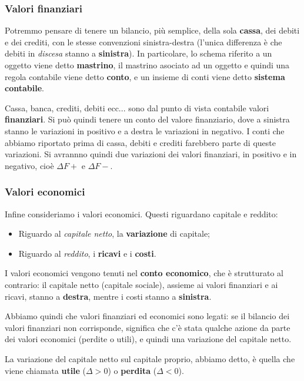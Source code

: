 \documentclass[a4paper,11pt]{article}
\begin{document}
\subsubsection{Valori finanziari}
Potremmo pensare di tenere un bilancio, più semplice, della sola \textbf{cassa}, dei debiti e dei crediti, con le stesse convenzioni sinistra-destra (l'unica differenza è che debiti in \textit{discesa} stanno a \textbf{sinistra}).
In particolare, lo schema riferito a un oggetto viene detto \textbf{mastrino}, il mastrino asociato ad un oggetto e quindi una regola contabile viene detto \textbf{conto}, e un insieme di conti viene detto \textbf{sistema contabile}.

Cassa, banca, crediti, debiti ecc... sono dal punto di vista contabile valori \textbf{finanziari}.
Si può quindi tenere un conto del valore finanziario, dove a sinistra stanno le variazioni in positivo e a destra le variazioni in negativo.
I conti che abbiamo riportato prima di cassa, debiti e crediti farebbero parte di queste variazioni.
Si avrannno quindi due variazioni dei valori finanziari, in positivo e in negativo, cioè $\Delta F+$ e $\Delta F-$.

\subsubsection{Valori economici}
Infine consideriamo i valori economici.
Questi riguardano capitale e reddito:
\begin{itemize}
	\item Riguardo al \textit{capitale netto}, la \textbf{variazione} di capitale;
	\item Riguardo al \textit{reddito}, i \textbf{ricavi} e i \textbf{costi}.
\end{itemize}

I valori economici vengono tenuti nel \textbf{conto economico}, che è strutturato al contrario: il capitale netto (capitale sociale), assieme ai valori finanziari e ai ricavi, stanno a \textbf{destra}, mentre i costi stanno a \textbf{sinistra}.

\par\medskip

Abbiamo quindi che valori finanziari ed economici sono legati: se il bilancio dei valori finanziari non corrisponde, significa che c'è stata qualche azione da parte dei valori economici (perdite o utili), e quindi una variazione del capitale netto.

La variazione del capitale netto sul capitale proprio, abbiamo detto, è quella che viene chiamata \textbf{utile} ($\Delta > 0$) o \textbf{perdita} ($\Delta < 0$).
\end{document}
